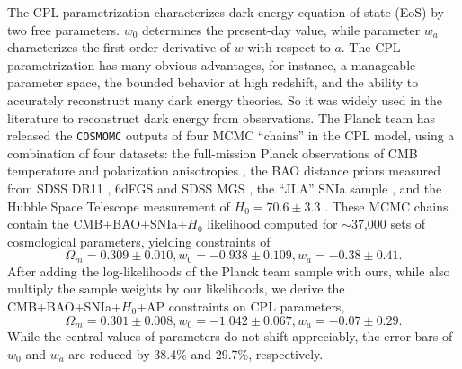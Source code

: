 \documentclass[prl,twocolumn,superscriptaddress,aps,amsmath,amssymb,nofootinbib,altaffilletter]{revtex4}
\begin{document}
The CPL parametrization characterizes dark energy equation-of-state (EoS) by two free parameters.
$w_0$ determines the present-day value, while parameter $w_a$ characterizes the first-order derivative of $w$ with respect to $a$. 
The CPL parametrization has many obvious advantages, for instance, a manageable parameter space, 
the bounded behavior at high redshift, 
and the ability to accurately reconstruct many dark energy theories\cite{CPL_L}. 
So it was widely used in the literature to reconstruct dark energy from observations.
The Planck team has released the {\texttt {COSMOMC}} \citep{LB2002} outputs of four MCMC ``chains'' in the CPL model, 
using a combination of four datasets:
the full-mission Planck observations of CMB temperature and polarization anisotropies \cite{Planck2015},
the BAO distance priors measured from SDSS DR11 \citep{Anderson2013}, 6dFGS \citep{6dFGS} and SDSS MGS \citep{MGS},
the ``JLA'' SNIa sample \citep{JLA},
and the Hubble Space Telescope measurement of $H_0=70.6\pm3.3$ \cite{Riess2011,E14H0}.
These MCMC chains contain the CMB+BAO+SNIa+$H_0$ likelihood computed for $\sim$37,000 sets of cosmological parameters,
yielding constraints of %
\begin{equation}
 \Omega_m = 0.309 \pm 0.010, w_0 = -0.938 \pm 0.109, w_a = -0.38 \pm 0.41.
\end{equation}
After adding the log-likelihoods of the Planck team sample with ours, 
while also multiply the sample weights by our likelihoods, 
we derive the CMB+BAO+SNIa+$H_0$+AP constraints on CPL parameters, %
\begin{equation}
\Omega_m = 0.301 \pm 0.008, w_0 = -1.042 \pm 0.067, w_a = -0.07 \pm 0.29.
\end{equation}
While the central values of parameters do not shift appreciably,
the error bars of $w_0$ and $w_a$ are reduced by 38.4\% and 29.7\%, respectively.%
\end{document}
